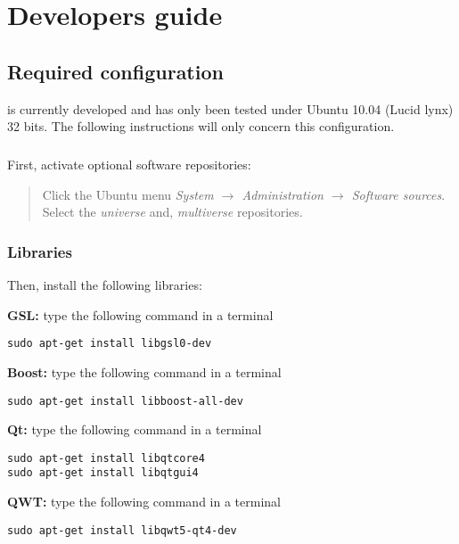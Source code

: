 \chapter{Developers guide}
\label{developers}

\section{Required configuration}
\biips{} is currently developed and has only been tested under Ubuntu 10.04 (Lucid lynx) 32 bits. The following instructions will only concern this configuration.

\paragraph{}
First, activate optional software repositories:
\begin{quote}
Click the Ubuntu menu \emph{System $\rightarrow$ Administration $\rightarrow$ Software sources}. \\
Select the \emph{universe} and, \emph{multiverse} repositories.
\end{quote}

\subsection{Libraries}
Then, install the following libraries:

\begin{list}{}{}

\item[\textbf{GSL:}] type the following command in a terminal
\begin{verbatim}
sudo apt-get install libgsl0-dev
\end{verbatim}


 \item[\textbf{Boost:}] type the following command in a terminal
\begin{verbatim}
sudo apt-get install libboost-all-dev
\end{verbatim}


\item[\textbf{Qt:}] type the following command in a terminal
\begin{verbatim}
sudo apt-get install libqtcore4
sudo apt-get install libqtgui4
\end{verbatim}


\item[\textbf{QWT:}] type the following command in a terminal
\begin{verbatim}
sudo apt-get install libqwt5-qt4-dev
\end{verbatim}

\end{list}


